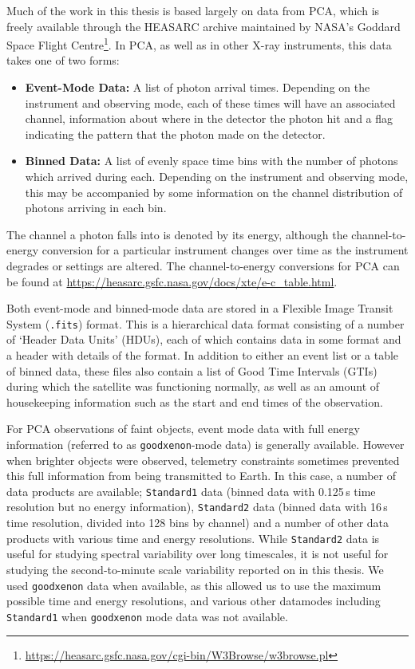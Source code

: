 \par Much of the work in this thesis is based largely on data from PCA, which is freely available through the HEASARC archive maintained by NASA's Goddard Space Flight Centre\footnote{\url{https://heasarc.gsfc.nasa.gov/cgi-bin/W3Browse/w3browse.pl}}.  In PCA, as well as in other X-ray instruments, this data takes one of two forms:
\begin{itemize}
\item \textbf{Event-Mode Data:} A list of photon arrival times.  Depending on the instrument and observing mode, each of these times will have an associated channel, information about where in the detector the photon hit and a flag indicating the pattern that the photon made on the detector.
\item \textbf{Binned Data:} A list of evenly space time bins with the number of photons which arrived during each.  Depending on the instrument and observing mode, this may be accompanied by some information on the channel distribution of photons arriving in each bin.
\end{itemize}
\par The channel a photon falls into is denoted by its energy, although the channel-to-energy conversion for a particular instrument changes over time as the instrument degrades or settings are altered.  The channel-to-energy conversions for PCA can be found at \url{https://heasarc.gsfc.nasa.gov/docs/xte/e-c_table.html}.
\par Both event-mode and binned-mode data are stored in a Flexible Image Transit System (\texttt{.fits}) format.  This is a hierarchical data format consisting of a number of `Header Data Units' (HDUs), each of which contains data in some format and a header with details of the format.  In addition to either an event list or a table of binned data, these files also contain a list of Good Time Intervals (GTIs) during which the satellite was functioning normally, as well as an amount of housekeeping information such as the start and end times of the observation.
\par For PCA observations of faint objects, event mode data with full energy information (referred to as \texttt{goodxenon}-mode data) is generally available.  However when brighter objects were observed, telemetry constraints sometimes prevented this full information from being transmitted to Earth.  In this case, a number of data products are available; \texttt{Standard1} data (binned data with 0.125\,s time resolution but no energy information), \texttt{Standard2} data (binned data with 16\,s time resolution, divided into 128 bins by channel) and a number of other data products with various time and energy resolutions.  While \texttt{Standard2} data is useful for studying spectral variability over long timescales, it is not useful for studying the second-to-minute scale variability reported on in this thesis.  We used \texttt{goodxenon} data when available, as this allowed us to use the maximum possible time and energy resolutions, and various other datamodes including \texttt{Standard1} when \texttt{goodxenon} mode data was not available.

